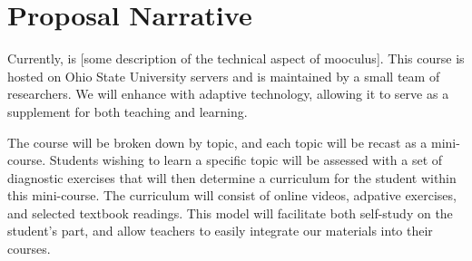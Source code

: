 \section{Proposal Narrative}


%
%
%
%
%
%
%




Currently, \mooculus is [some description of the technical aspect of
  mooculus]. This course is hosted on Ohio State University servers and
is maintained by a small team of researchers. We will enhance
\mooculus with adaptive technology, allowing it to serve as a
supplement for both teaching and learning.


The course will be broken down by topic, and each topic will be recast
as a mini-course. Students wishing to learn a specific topic will be
assessed with a set of diagnostic exercises that will then determine a
curriculum for the student within this mini-course. The curriculum
will consist of online videos, adpative exercises, and selected
textbook readings. This model will facilitate both self-study on the
student's part, and allow teachers to easily integrate our materials
into their courses.

